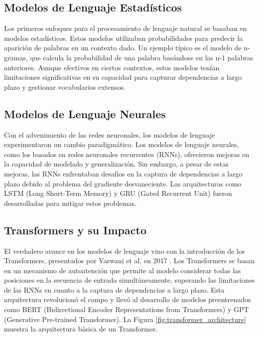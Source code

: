 \subsection{Modelos de Lenguaje Estadísticos}
Los primeros enfoques para el procesamiento de lenguaje natural se basaban en modelos estadísticos. Estos modelos utilizaban probabilidades para predecir la aparición de palabras en un contexto dado. Un ejemplo típico es el modelo de n-gramas, que calcula la probabilidad de una palabra basándose en las n-1 palabras anteriores. Aunque efectivos en ciertos contextos, estos modelos tenían limitaciones significativas en su capacidad para capturar dependencias a largo plazo y gestionar vocabularios extensos.

\subsection{Modelos de Lenguaje Neurales}
Con el advenimiento de las redes neuronales, los modelos de lenguaje experimentaron un cambio paradigmático. Los modelos de lenguaje neurales, como los basados en redes neuronales recurrentes (RNNs), ofrecieron mejoras en la capacidad de modelado y generalización. Sin embargo, a pesar de estas mejoras, las RNNs enfrentaban desafíos en la captura de dependencias a largo plazo debido al problema del gradiente desvaneciente. Las arquitecturas como LSTM (Long Short-Term Memory) y GRU (Gated Recurrent Unit) fueron desarrolladas para mitigar estos problemas.

\subsection{Transformers y su Impacto}
El verdadero avance en los modelos de lenguaje vino con la introducción de los Transformers, presentados por Vaswani et al. en 2017 \citep{vaswani2017attention}. Los Transformers se basan en un mecanismo de autoatención que permite al modelo considerar todas las posiciones en la secuencia de entrada simultáneamente, superando las limitaciones de las RNNs en cuanto a la captura de dependencias a largo plazo. Esta arquitectura revolucionó el campo y llevó al desarrollo de modelos preentrenados como BERT (Bidirectional Encoder Representations from Transformers) y GPT (Generative Pre-trained Transformer). La Figura \ref{fig:transformer_architecture} muestra la arquitectura básica de un Transformer.

